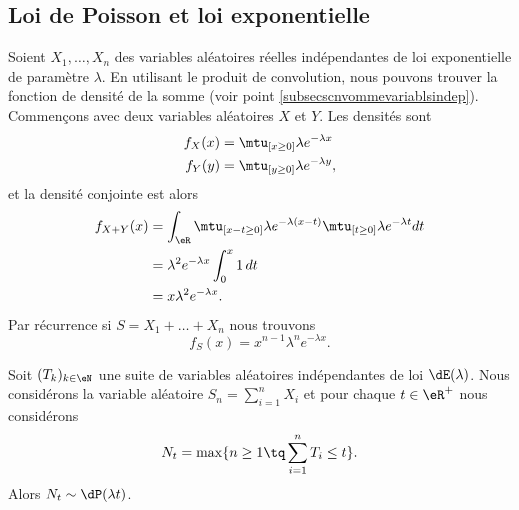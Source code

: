 \subsection{Loi de Poisson et loi exponentielle}
\label{subsecPoissonetexpo}

Soient \( X_1,\ldots,X_n\) des variables aléatoires réelles indépendantes de loi exponentielle de paramètre \( \lambda\). En utilisant le produit de convolution, nous pouvons trouver la fonction de densité de la somme (voir point \ref{subsecscnvommevariablsindep}). Commençons avec deux variables aléatoires \( X\) et \( Y\). Les densités sont
\begin{subequations}
    \begin{align}
        f_X(x)&=\mtu_{[x\geq 0]}\lambda e^{-\lambda x}\\
        f_Y(y)&=\mtu_{[y\geq 0]}\lambda e^{-\lambda y},
    \end{align}
\end{subequations}
et la densité conjointe est alors
\begin{subequations}
    \begin{align}
        f_{X+Y}(x)&=\int_{\eR}\mtu_{[x-t\geq 0]}\lambda e^{-\lambda(x-t)}\mtu_{[t\geq 0]}\lambda e^{-\lambda t}dt\\
        &=\lambda^2 e^{-\lambda x}\int_0^x1\,dt\\
        &=x\lambda^2 e^{-\lambda x}.
    \end{align}
\end{subequations}
Par récurrence si \( S=X_1+\ldots+X_n\) nous trouvons
\begin{equation}
    f_S(x)=x^{n-1}\lambda^n e^{-\lambda x}.
\end{equation}

\begin{proposition}
Soit \( (T_k)_{k\in\eN}\) une suite de variables aléatoires indépendantes de loi \( \dE(\lambda)\). Nous considérons la variable aléatoire \( S_n=\sum_{i=1}^nX_i\) et pour chaque \( t\in\eR^+\) nous considérons
\begin{equation}
    N_t=\max\{ n\geq 1\tq \sum_{i=1}^nT_i\leq t \}.
\end{equation}
Alors \( N_t\sim\dP(\lambda t)\). 

\end{proposition}

